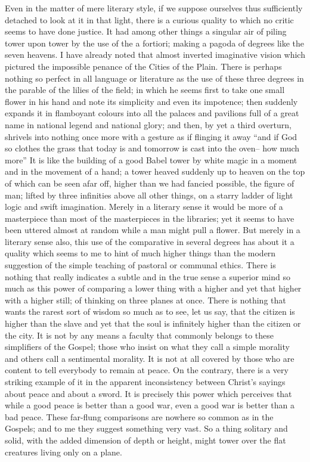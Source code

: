 Even in the matter of mere literary style, if we suppose ourselves thus sufficiently detached to look at it in that light, there is a curious quality to which no critic seems to have done justice. It had among other things a singular air of piling tower upon tower by the use of the a fortiori; making a pagoda of degrees like the seven heavens. I have already noted that almost inverted imaginative vision which pictured the impossible penance of the Cities of the Plain. There is perhaps nothing so perfect in all language or literature as the use of these three degrees in the parable of the lilies of the field; in which he seems first to take one small flower in his hand and note its simplicity and even its impotence; then suddenly expands it in flamboyant colours into all the palaces and pavilions full of a great name in national legend and national glory; and then, by yet a third overturn, shrivels into nothing once more with a gesture as if flinging it away ``and if God so clothes the grass that today is and tomorrow is cast into the oven-- how much more'' It is like the building of a good Babel tower by white magic in a moment and in the movement of a hand; a tower heaved suddenly up to heaven on the top of which can be seen afar off, higher than we had fancied possible, the figure of man; lifted by three infinities above all other things, on a starry ladder of light logic and swift imagination. Merely in a literary sense it would be more of a masterpiece than most of the masterpieces in the libraries; yet it seems to have been uttered almost at random while a man might pull a flower. But merely in a literary sense also, this use of the comparative in several degrees has about it a quality which seems to me to hint of much higher things than the modern suggestion of the simple teaching of pastoral or communal ethics. There is nothing that really indicates a subtle and in the true sense a superior mind so much as this power of comparing a lower thing with a higher and yet that higher with a higher still; of thinking on three planes at once. There is nothing that wants the rarest sort of wisdom so much as to see, let us say, that the citizen is higher than the slave and yet that the soul is infinitely higher than the citizen or the city. It is not by any means a faculty that commonly belongs to these simplifiers of the Gospel; those who insist on what they call a simple morality and others call a sentimental morality. It is not at all covered by those who are content to tell everybody to remain at peace. On the contrary, there is a very striking example of it in the apparent inconsistency between Christ's sayings about peace and about a sword. It is precisely this power which perceives that while a good peace is better than a good war, even a good war is better than a bad peace. These far-flung comparisons are nowhere so common as in the Gospels; and to me they suggest something very vast. So a thing solitary and solid, with the added dimension of depth or height, might tower over the flat creatures living only on a plane.

